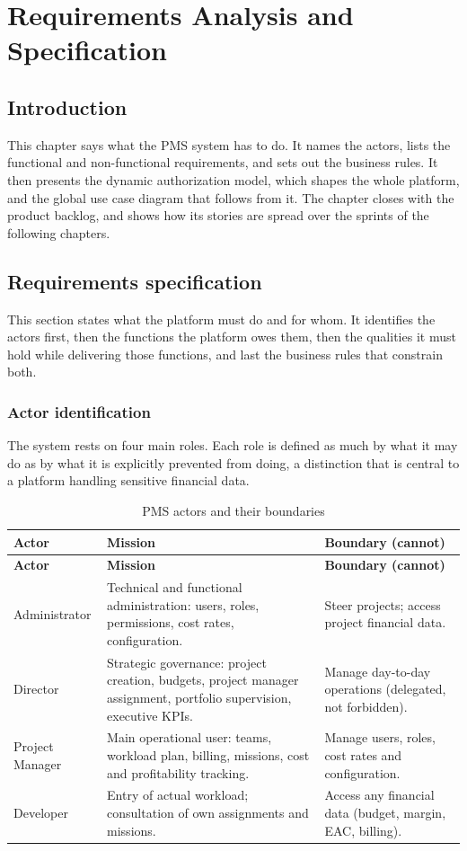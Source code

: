 \chapter{Requirements Analysis and Specification}

\section*{Introduction}
This chapter says what the PMS system has to do. It names the actors, lists the functional and
non-functional requirements, and sets out the business rules. It then presents the dynamic
authorization model, which shapes the whole platform, and the global use case diagram that follows
from it. The chapter closes with the product backlog, and shows how its stories are spread over
the sprints of the following chapters.
\section{Requirements specification}
This section states what the platform must do and for whom. It identifies the actors first, then
the functions the platform owes them, then the qualities it must hold while delivering those
functions, and last the business rules that constrain both.

\subsection{Actor identification}
The system rests on four main roles. Each role is defined as much by what it may do as by what it
is explicitly prevented from doing, a distinction that is central to a platform handling
sensitive financial data.

\begin{longtable}{|m{3cm}|m{6.5cm}|m{5cm}|}
\caption{PMS actors and their boundaries}\label{tab:acteurs}\\
\hline
\textbf{Actor} & \textbf{Mission} & \textbf{Boundary (cannot)} \\
\hline
\endfirsthead
\hline
\textbf{Actor} & \textbf{Mission} & \textbf{Boundary (cannot)} \\
\hline
\endhead
\endfoot
\endlastfoot
\hline
Administrator & Technical and functional administration: users, roles, permissions, cost rates,
configuration. & Steer projects; access project financial data. \\
\hline
Director & Strategic governance: project creation, budgets, project manager assignment, portfolio
supervision, executive KPIs. & Manage day-to-day operations (delegated, not forbidden). \\
\hline
Project Manager & Main operational user: teams, workload plan, billing, missions, cost and
profitability tracking. & Manage users, roles, cost rates and configuration. \\
\hline
Developer & Entry of actual workload; consultation of own assignments and missions. & Access any
financial data (budget, margin, EAC, billing). \\
\hline
\end{longtable}

